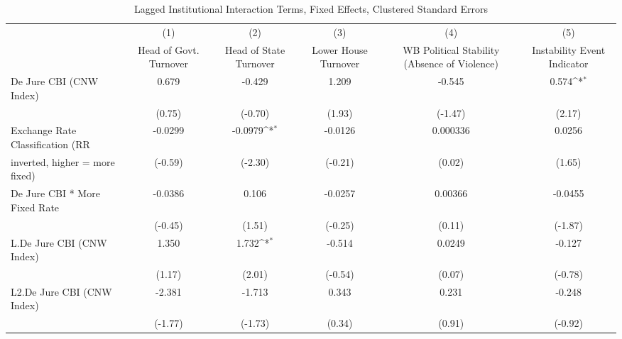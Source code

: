 \begin{table}[htbp]\centering
\def\sym#1{\ifmmode^{#1}\else\(^{#1}\)\fi}
\caption{Lagged Institutional Interaction Terms, Fixed Effects, Clustered Standard Errors \label{intlagsDJ}}
\begin{tabular}{l*{5}{c}}
\toprule
                                        &\multicolumn{1}{c}{(1)}&\multicolumn{1}{c}{(2)}&\multicolumn{1}{c}{(3)}&\multicolumn{1}{c}{(4)}&\multicolumn{1}{c}{(5)}\\
                                        &\multicolumn{1}{c}{Head of Govt. Turnover}&\multicolumn{1}{c}{Head of State Turnover}&\multicolumn{1}{c}{Lower House Turnover}&\multicolumn{1}{c}{WB Political Stability (Absence of Violence)}&\multicolumn{1}{c}{Instability Event Indicator}\\
\midrule
De Jure CBI (CNW Index)                 &    0.679         &   -0.429         &    1.209         &   -0.545         &    0.574\sym{*}  \\
                                        &   (0.75)         &  (-0.70)         &   (1.93)         &  (-1.47)         &   (2.17)         \\
\addlinespace
Exchange Rate Classification (RR        &  -0.0299         &  -0.0979\sym{*}  &  -0.0126         & 0.000336         &   0.0256         \\
inverted, higher = more fixed)          &  (-0.59)         &  (-2.30)         &  (-0.21)         &   (0.02)         &   (1.65)         \\
\addlinespace
De Jure CBI * More Fixed Rate           &  -0.0386         &    0.106         &  -0.0257         &  0.00366         &  -0.0455         \\
                                        &  (-0.45)         &   (1.51)         &  (-0.25)         &   (0.11)         &  (-1.87)         \\
\addlinespace
L.De Jure CBI (CNW Index)               &    1.350         &    1.732\sym{*}  &   -0.514         &   0.0249         &   -0.127         \\
                                        &   (1.17)         &   (2.01)         &  (-0.54)         &   (0.07)         &  (-0.78)         \\
\addlinespace
L2.De Jure CBI (CNW Index)              &   -2.381         &   -1.713         &    0.343         &    0.231         &   -0.248         \\
                                        &  (-1.77)         &  (-1.73)         &   (0.34)         &   (0.91)         &  (-0.92)         \\

\end{tabular}
\end{table}
